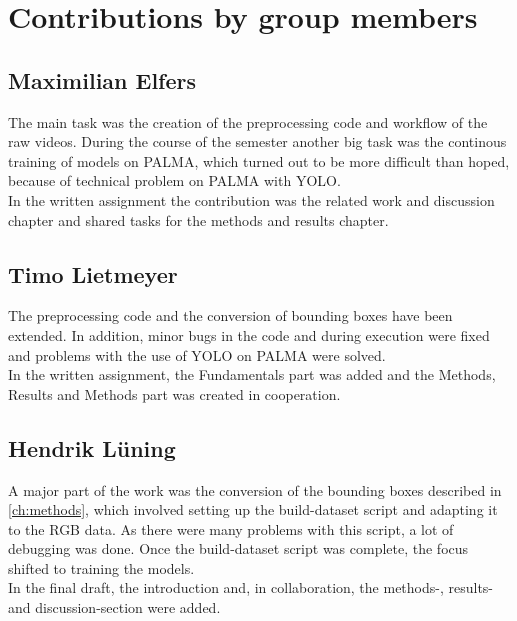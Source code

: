\chapter{Contributions by group members}
\label{ch:contributions}


\section{Maximilian Elfers}

The main task was the creation of the preprocessing code and workflow of the raw videos. During the course of the semester another big task was the continous training of models on PALMA, which turned out to be more difficult than hoped, because of technical problem on PALMA with YOLO. \\
In the written assignment the contribution was the related work and discussion chapter and shared tasks for the methods and results chapter.

\section{Timo Lietmeyer}
The preprocessing code and the conversion of bounding boxes have been extended. In addition, minor bugs in the code and during execution were fixed and problems with the use of YOLO on PALMA were solved. \\
In the written assignment, the Fundamentals part was added and the Methods, Results and Methods part was created in cooperation.

\section{Hendrik Lüning}
A major part of the work was the conversion of the bounding boxes described in \ref{ch:methods}, which involved setting up the build-dataset script and adapting it to the RGB data. As there were many problems with this script, a lot of debugging was done. Once the build-dataset script was complete, the focus shifted to training the models.\\
In the final draft, the introduction and, in collaboration, the methods-, results- and discussion-section were added.
